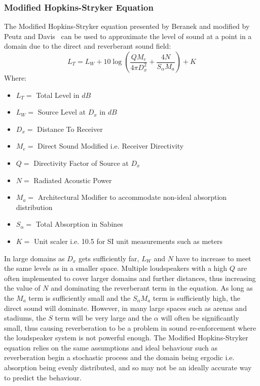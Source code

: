 \subsubsection{Modified Hopkins-Stryker Equation}
The Modified Hopkins-Stryker equation presented by Beranek and modified by Peutz and Davis~\cite{Davis2014} can be used to approximate the level of sound at a point in a domain due to the direct and reverberant sound field:\\
\begin{equation}
L_T = L_W + 10 \log \left( \frac{Q M_e}{4 \pi D_x^2} + \frac{4 N}{S_\alpha M_a} \right) + K
\end{equation}
Where:
\begin{itemize}
\item $L_T =$ Total Level in $dB$
\item $L_W =$ Source Level at $D_x$ in $dB$
\item $D_x =$ Distance To Receiver 
\item $M_e =$ Direct Sound Modified i.e. Receiver Directivity
\item $Q =$ Directivity Factor of Source at $D_x$
\item $N =$ Radiated Acoustic Power
\item $M_a =$ Architectural Modifier to accommodate non-ideal absorption distribution
\item $S_\alpha =$ Total Absorption in Sabines
\item $K =$ Unit scaler i.e. 10.5 for SI unit measurements such as meters
\end{itemize}
In large domains as $D_x$ gets sufficiently far, $L_W$ and $N$ have to increase to meet the same levels as in a smaller space. Multiple loudspeakers with a high $Q$ are often implemented   to cover larger domains and further distances, thus increasing the value of $N$ and dominating the reverberant term in the equation. As long as the $M_a$ term is sufficiently small and the $S_\alpha M_a$ term is sufficiently high, the direct sound will dominate. However, in many large spaces such as arenas and stadiums, the $S$ term will be very large and the $\alpha$ will often be significantly small, thus causing reverberation to be a problem in sound re-enforcement where the loudspeaker system is not powerful enough. The Modified Hopkins-Stryker equation relies  on the same assumptions and ideal behaviour such as reverberation begin a stochastic process and the domain being ergodic i.e. absorption being evenly distributed, and so may not be an ideally accurate way to predict the behaviour. 

